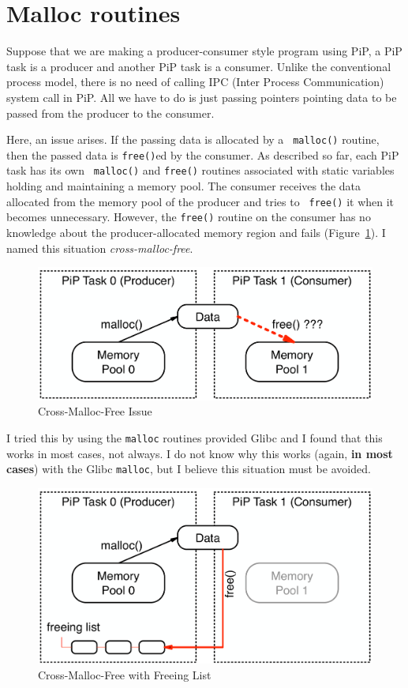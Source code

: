 
\section{Malloc routines}\label{sec:malloc}

Suppose that we are making a producer-consumer style program using PiP,
a PiP task is a producer and another PiP task is a consumer. Unlike the
conventional process model, there is no need of calling IPC (Inter
Process Communication) system call in PiP. All we have to do is just
passing pointers pointing data to be passed from the producer to the
consumer.

Here, an issue arises. If the passing data is allocated by a {\tt
  malloc()} routine, then the passed data is {\tt free()}ed by
the consumer. As described so far, each PiP task has its own {\tt
  malloc()} and {\tt free()} routines associated with static variables
holding and maintaining a memory pool. The consumer receives the data
allocated from the memory pool of the producer and tries to {\tt
  free()} it when it becomes unnecessary. However, the {\tt free()}
routine on the consumer has no knowledge about the producer-allocated
memory region and fails (Figure~\ref{fig:cross-malloc-free-issue}). I
named this situation {\it cross-malloc-free}. 

\begin{figure}[ht]
\centering
\includegraphics[width=0.7\columnwidth]{malloc/Figs/ProducerConsumer.pdf}
\caption{Cross-Malloc-Free Issue}
\label{fig:cross-malloc-free-issue}
\end{figure}

I tried this by using the {\tt malloc} routines provided Glibc and I
found that this works in most cases, not always. I do not know why
this works (again, {\bf in most cases}) with the Glibc {\tt malloc},
but I believe this situation must be avoided.

\begin{figure}[ht]
\centering
\includegraphics[width=0.7\columnwidth]{malloc/Figs/CrossMallocFree.pdf}
\caption{Cross-Malloc-Free with Freeing List}
\label{fig:cross-malloc-free}
\end{figure}

